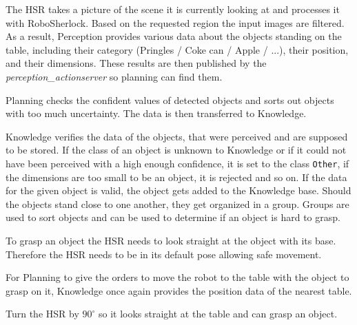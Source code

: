 \documentclass[main.tex]{subfiles}
\begin{document}
	\begin{perception}
	The HSR takes a picture of the scene it is currently looking at and processes it with RoboSherlock. Based on the requested region the input images are filtered. As a result, Perception provides various data about the objects standing on the table, including their category (Pringles / Coke can / Apple / ...), their position, and their dimensions. These results are then published by the \textit{perception\_actionserver} so planning can find them.\end{perception}
	
	\begin{planning}
	Planning checks the confident values of detected objects and sorts out objects with too much uncertainty. The data is then transferred to Knowledge.
	\end{planning}
	
	\begin{knowledge}
	Knowledge verifies the data of the objects, that were perceived and are supposed to be stored. If the class of an object is unknown to Knowledge or if it could not have been perceived with a high enough confidence, it is set to the class \texttt{Other}, if the dimensions are too small to be an object, it is rejected and so on. If the data for the given object is valid, the object gets added to the Knowledge base. Should the objects stand close to one another, they get organized in a group. Groups are used to sort objects and can be used to determine if an object is hard to grasp.
	\end{knowledge}
	
	\begin{manipulation}
	To grasp an object the HSR needs to look straight at the object with its base. Therefore the HSR needs to be in its default pose allowing safe movement.
	\end{manipulation}
	
	\begin{knowledge}
	For Planning to give the orders to move the robot to the table with the object to grasp on it, Knowledge once again provides the position data of the nearest table.
	\end{knowledge}
	
	\begin{navigation}
	Turn the HSR by $90^\circ$ so it looks straight at the table and can grasp an object.
	\end{navigation}
	
\end{document}
